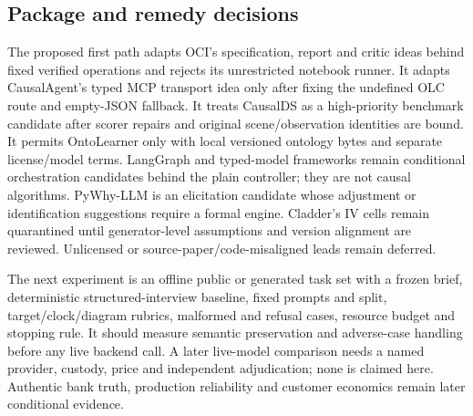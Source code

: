 \subsection{Package and remedy decisions}

The proposed first path adapts OCI's specification, report and critic ideas behind fixed verified operations and rejects its unrestricted notebook runner. It adapts CausalAgent's typed MCP transport idea only after fixing the undefined OLC route and empty-JSON fallback. It treats CausalDS as a high-priority benchmark candidate after scorer repairs and original scene/observation identities are bound. It permits OntoLearner only with local versioned ontology bytes and separate license/model terms. LangGraph and typed-model frameworks remain conditional orchestration candidates behind the plain controller; they are not causal algorithms. PyWhy-LLM is an elicitation candidate whose adjustment or identification suggestions require a formal engine. Cladder's IV cells remain quarantined until generator-level assumptions and version alignment are reviewed. Unlicensed or source-paper/code-misaligned leads remain deferred.

The next experiment is an offline public or generated task set with a frozen brief, deterministic structured-interview baseline, fixed prompts and split, target/clock/diagram rubrics, malformed and refusal cases, resource budget and stopping rule. It should measure semantic preservation and adverse-case handling before any live backend call. A later live-model comparison needs a named provider, custody, price and independent adjudication; none is claimed here. Authentic bank truth, production reliability and customer economics remain later conditional evidence.
